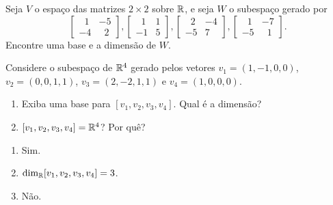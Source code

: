 \documentclass[12pt]{exam}
\begin{document}
    \begin{exercicio}
        Seja $V$ o espa\c{c}o das matrizes $2 \times 2$ sobre $\mathbb{R}$, e seja $W$ o subespa\c{c}o gerado por
        \[
            \begin{bmatrix}
                \phantom{x} 1 & -5\\
                -4 & \phantom{x} 2
            \end{bmatrix},
            \begin{bmatrix}
                \phantom{x} 1 & 1\\
                -1 & 5
            \end{bmatrix},
            \begin{bmatrix}
                \phantom{x} 2 & -4\\
                -5 & 7
            \end{bmatrix},
            \begin{bmatrix}
                \phantom{x} 1 & -7\\
                -5 & \phantom{x} 1
            \end{bmatrix}.
        \]
        Encontre uma base e a dimens\~ao de $W$.
    \end{exercicio}

    \begin{exercicio}
        Considere o subespa\c{c}o de $\mathbb{R}^4$ gerado pelos vetores $v_1 = (1, -1, 0, 0)$, $v_2 = (0, 0, 1, 1)$, $v_3 = (2, -2, 1, 1)$ e $v_4 = (1, 0, 0, 0)$.
        \begin{enumerate}[label={\alph*})]
            \item Exiba uma base para $[v_1, v_2, v_3, v_4]$. Qual \'e a dimens\~ao?

            \item $[v_1, v_2, v_3, v_4] = \mathbb{R}^4$? Por qu\^e?
        \end{enumerate}
        \begin{solucao}
            \begin{enumerate}[label={\alph*})]
                \item Sim.

                \item $\dim_{\mathbb{R}} [v_1, v_2, v_3, v_4] = 3$.

                \item N\~ao.
            \end{enumerate}
        \end{solucao}
    \end{exercicio}
\end{document}
